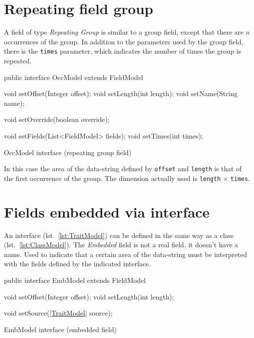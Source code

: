 \documentclass[a4paper,10pt]{report}
\newenvironment{elisting}[1][H]
  {\captionsetup{aboveskip=0pt}\begin{listing}[#1]}
  {\end{listing}%
}
\begin{document}
\section{Repeating field group}
A field of type \textsl{Repeating Group} is similar to a group field, except 
that there are $n$ occurrences of the group. 
In addition to the parameters used by the group field, there is the \verb!times! 
parameter, which indicates the number of times the group is repeated.

\begin{elisting}[!htb]
\begin{javacode}
public interface OccModel extends  FieldModel {
    void setOffset(Integer offset);
    void setLength(int length);
    void setName(String name);
    
    void setOverride(boolean override);
    
    void setFields(List<FieldModel> fields);
    void setTimes(int times);
}
\end{javacode}
\caption{OccModel interface (repeating group field)}
\label{lst:OccModel}
\end{elisting}

In this case the area of the data-string defined by \verb!offset! and 
\verb!length! is that of the first occurrence of the group. 
The dimension actually used is \verb!length! $\times$ \verb!times!.

\section{Fields embedded via interface}
An interface (lst.~\ref{lst:TraitModel}) can be defined in the same way as a 
class (lst.~\ref{lst:ClassModel}). 
The \textsl{Embedded} field is not a real field, it doesn't have a name. 
Used to indicate that a certain area of the data-string must be interpreted with 
the fields defined by the indicated interface.

\begin{elisting}[!htb]
\begin{javacode}
public interface EmbModel extends FieldModel {
    void setOffset(Integer offset);
    void setLength(int length);
    
    void setSource(|\hyperref[lst:TraitModel]{TraitModel}| source);
}
\end{javacode}
\caption{EmbModel interface (embedded field)}
\label{lst:EmbModel}
\end{elisting}
\end{document}
